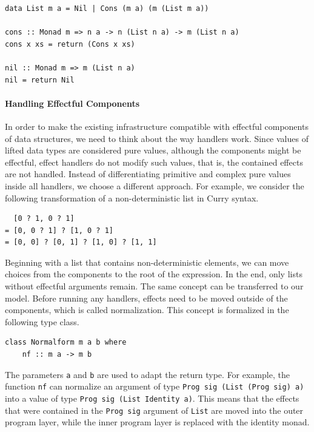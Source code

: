 \documentclass[a4paper, 11pt, fleqn, twoside]{scrreprt}
\newcommand{\hinl}[1]{\texttt{#1}}
\begin{document}
\begin{verbatim}
data List m a = Nil | Cons (m a) (m (List m a))

cons :: Monad m => n a -> n (List n a) -> m (List n a)
cons x xs = return (Cons x xs)

nil :: Monad m => m (List n a)
nil = return Nil
\end{verbatim}

\paragraph{Handling Effectful Components}
In order to make the existing infrastructure compatible with effectful components of data structures, we need to think about the way handlers work.
Since values of lifted data types are considered pure values, although the components might be effectful, effect handlers do not modify such values, that is, the contained effects are not handled.
Instead of differentiating primitive and complex pure values inside all handlers, we choose a different approach.
For example, we consider the following transformation of a non-deterministic list in Curry syntax.

\begin{verbatim}
  [0 ? 1, 0 ? 1]
= [0, 0 ? 1] ? [1, 0 ? 1]
= [0, 0] ? [0, 1] ? [1, 0] ? [1, 1]
\end{verbatim}

Beginning with a list that contains non-deterministic elements, we can move choices from the components to the root of the expression.
In the end, only lists without effectful arguments remain.
The same concept can be transferred to our model.
Before running any handlers, effects need to be moved outside of the components, which is called normalization.
This concept is formalized in the following type class.

\begin{verbatim}
class Normalform m a b where
    nf :: m a -> m b
\end{verbatim}

The parameters \hinl{a} and \hinl{b} are used to adapt the return type.
For example, the function \hinl{nf} can normalize an argument of type \hinl{Prog sig (List (Prog sig) a)} into a value of type \hinl{Prog sig (List Identity a)}.
This means that the effects that were contained in the \hinl{Prog sig} argument of \hinl{List} are moved into the outer program layer, while the inner program layer is replaced with the identity monad.
\end{document}
